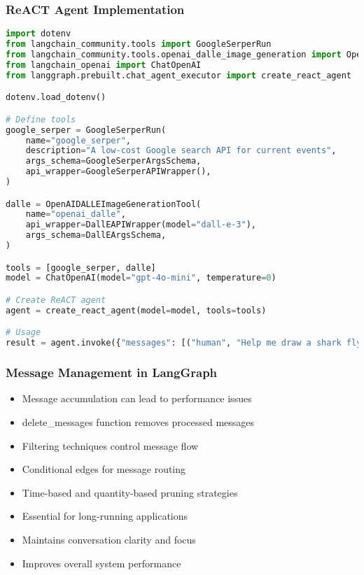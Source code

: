 \begin{frame}[fragile]\frametitle{ReACT Agent Implementation}
      \begin{lstlisting}[language=Python, basicstyle=\tiny]
import dotenv
from langchain_community.tools import GoogleSerperRun
from langchain_community.tools.openai_dalle_image_generation import OpenAIDALLEImageGenerationTool
from langchain_openai import ChatOpenAI
from langgraph.prebuilt.chat_agent_executor import create_react_agent

dotenv.load_dotenv()

# Define tools
google_serper = GoogleSerperRun(
    name="google_serper",
    description="A low-cost Google search API for current events",
    args_schema=GoogleSerperArgsSchema,
    api_wrapper=GoogleSerperAPIWrapper(),
)

dalle = OpenAIDALLEImageGenerationTool(
    name="openai_dalle",
    api_wrapper=DallEAPIWrapper(model="dall-e-3"),
    args_schema=DallEArgsSchema,
)

tools = [google_serper, dalle]
model = ChatOpenAI(model="gpt-4o-mini", temperature=0)

# Create ReACT agent
agent = create_react_agent(model=model, tools=tools)

# Usage
result = agent.invoke({"messages": [("human", "Help me draw a shark flying in the sky")]})
      \end{lstlisting}
\end{frame}

\begin{frame}[fragile]\frametitle{Message Management in LangGraph}
      \begin{itemize}
        \item Message accumulation can lead to performance issues
        \item delete\_messages function removes processed messages
        \item Filtering techniques control message flow
        \item Conditional edges for message routing
        \item Time-based and quantity-based pruning strategies
        \item Essential for long-running applications
        \item Maintains conversation clarity and focus
        \item Improves overall system performance
      \end{itemize}
\end{frame}

